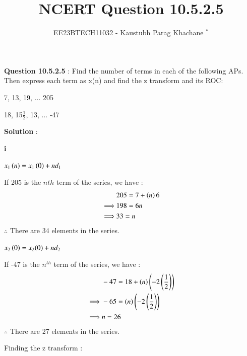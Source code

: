 \documentclass[journal,12pt,twocolumn]{IEEEtran}
\theoremstyle{remark}
\begin{document}

\vspace{3cm}

\Large\title{NCERT Question 10.5.2.5}
\large\author{EE23BTECH11032 - Kaustubh Parag Khachane $^{*}$%
}
\maketitle
\newpage
\bigskip

\renewcommand{\thefigure}{\theenumi}
\renewcommand{\thetable}{\theenumi}
\large\textbf{Question 10.5.2.5} : \normalsize Find the number of terms in each of the following APs. Then express each term as x(n) and find the z transform and its ROC: 

 7, 13, 19, ... 205

 18, 15$\frac{1}{2}$, 13, ... -47

\vspace{4mm} 

\large\textbf{Solution} :\normalsize
\vspace{4mm}

\textbf{\brak i} 

$x_{1}\left(n\right) = x_{1}\left(0\right) + nd_{1}$

If 205 is the $n{th}$ term of the series, we have :
\begin{align}
&205 = 7 + \left(n\right)6\\ 
\implies&  198 = 6n\\
\implies&  33 = n
\end{align}
$\therefore$ There are 34 elements in the series.

\vspace{4mm}

\textbf{} 

$x_{2}\left(0\right) = x_{2}(0) + nd_{2}$

If -47 is the $n^{th}$ term of the series, we have :
\begin{align}
&-47 = 18 + \left(n\right)\left(-2\left(\frac{1}{2}\right)\right)\\ 
\implies& -65 = \left(n\right)\left(-2\left(\frac{1}{2}\right)\right)\\
\implies& n = 26
\end{align} 
$\therefore$ There are 27 elements in the series.

\vspace{8mm}
Finding the z transform : \\
\textbf{}
\end{document}
